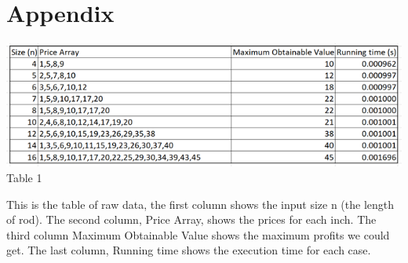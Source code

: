 \documentclass{article}
\begin{document}
\section{\textbf{Appendix}} 
\begin{center}
\includegraphics[scale = 0.7]{table} \\
\scriptsize{Table 1}
\end{center}
\indent \indent This is the table of raw data, the first column shows the input size n (the length of rod). The second column, Price Array, shows the prices for each inch. The third column Maximum Obtainable Value shows the maximum profits we could get. The last column, Running time shows the execution time for each case.
\end{document}
